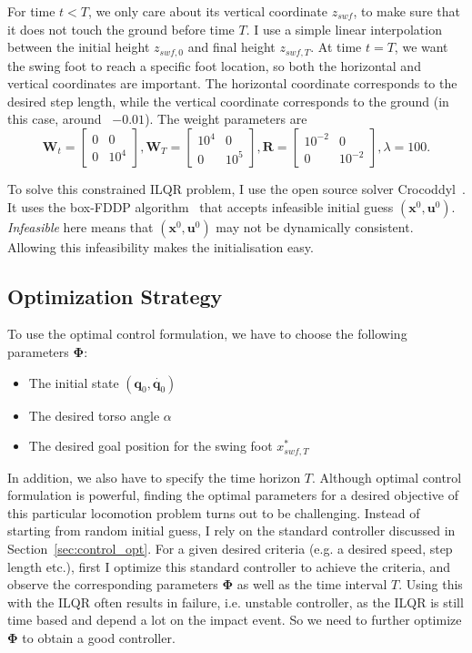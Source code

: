 For time $t < T$, we only care about its vertical coordinate $z_{swf}$, to make sure that it does not touch the ground before time $T$. I use a simple linear interpolation between the initial height $z_{swf,0}$ and final height $z_{swf,T}$. At time $t=T$, we want the swing foot to reach a specific foot location, so both the horizontal and vertical coordinates are important. The horizontal coordinate corresponds to the desired step length, while the vertical coordinate corresponds to the ground (in this case, around ~$-0.01$). The weight parameters are
\begin{equation}
\bm{W}_t = \begin{bmatrix}
0 & 0 \\ 0 & 10^4  
\end{bmatrix}, 
\bm{W}_T = \begin{bmatrix}
10^4 & 0 \\ 0 & 10^5  
\end{bmatrix}, 
\bm{R} = \begin{bmatrix}
10^{-2} & 0 \\ 0 & 10^{-2}  
\end{bmatrix}, 
\lambda = 100.
\end{equation}   

To solve this constrained ILQR problem, I use the open source solver Crocoddyl~\cite{Mastalli}. It uses the box-FDDP algorithm~\cite{mastalli2020direct} that accepts infeasible initial guess $(\bm{x}^0, \bm{u}^0)$. \emph{Infeasible} here means that $(\bm{x}^0, \bm{u}^0)$ may not be dynamically consistent. Allowing this infeasibility makes the initialisation easy. 

\subsection{Optimization Strategy}
\label{sec:opt_strat}

To use the optimal control formulation, we have to choose the following parameters $\bm{\Phi}$:
\begin{itemize}
\item The initial state $(\bm{q}_0, \dot{\bm{q}_0})$
\item The desired torso angle $\alpha$
\item The desired goal position for the swing foot $x_{swf,T}^*$
\end{itemize}

In addition, we also have to specify the time horizon $T$. Although optimal control formulation is powerful, finding the optimal parameters for a desired objective of this particular locomotion problem turns out to be challenging. Instead of starting from random initial guess, I rely on the standard controller discussed in Section~\ref{sec:control_opt}. For a given desired criteria (e.g. a desired speed, step length etc.), first I optimize this standard controller to achieve the criteria, and observe the corresponding parameters $\bm{\Phi}$ as well as the time interval $T$. Using this with the ILQR often results in failure, i.e. unstable controller, as the ILQR is still time based and depend a lot on the impact event. So we need to further optimize $\bm{\Phi}$ to obtain a good controller.

